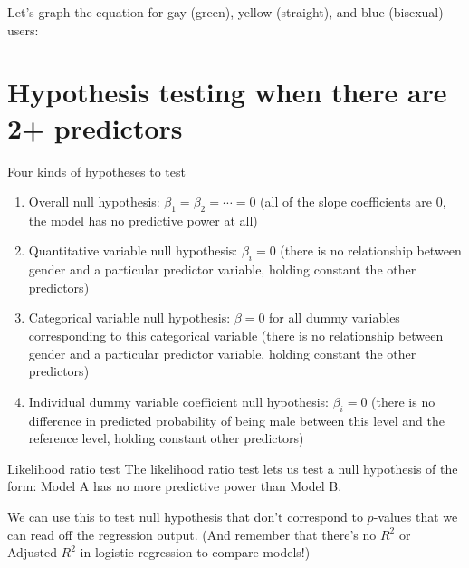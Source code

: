 \documentclass{beamer}\usepackage[]{graphicx}\usepackage[]{color}
\newenvironment{knitrout}{}{} %
\begin{document}
\begin{darkframes}
    \begin{frame}
      Let's graph the equation for gay (green), yellow (straight), and blue (bisexual) users:
\begin{knitrout}


\end{knitrout}
    \end{frame}

    \section{Hypothesis testing when there are 2+ predictors}

    \begin{frame}{Four kinds of hypotheses to test}
      \begin{enumerate}[<+->]
        \item \alert{Overall} null hypothesis: $\beta_1=\beta_2=\cdots=0$ (all of the slope coefficients are 0, the model has no predictive power at all)
        \item \alert{Quantitative variable} null hypothesis: $\beta_i=0$ (there is no relationship between gender and a particular predictor variable, holding constant the other predictors)
        \item \alert{Categorical variable} null hypothesis: $\beta=0$ for all dummy variables corresponding to this categorical variable (there is no relationship between gender and a particular predictor variable, holding constant the other predictors)
        \item \alert{Individual dummy variable coefficient} null hypothesis: $\beta_i=0$ (there is no difference in predicted probability of being male between this level and the reference level, holding constant other predictors)
      \end{enumerate}
    \end{frame}

    \begin{frame}{Likelihood ratio test}
      The \alert{likelihood ratio test} lets us test a null hypothesis of the form: Model A has no more predictive power than Model B.

      \bigskip

      We can use this to test null hypothesis that don't correspond to $p$-values that we can read off the regression output. (And remember that there's no $R^2$ or Adjusted $R^2$ in logistic regression to compare models!)
    \end{frame}


\end{darkframes}
\end{document}
